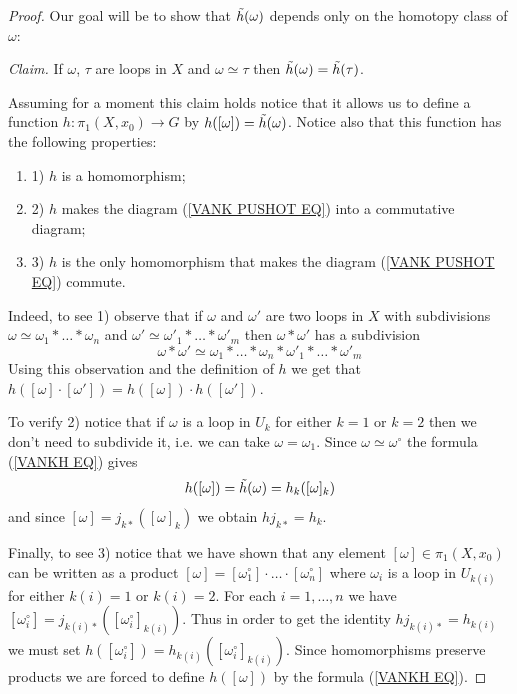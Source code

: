 \documentclass[11pt, letterpaper, oneside]{report}
\theoremstyle{pplain}
\theoremstyle{ddefinition}
\theoremstyle{nnn}
\theoremstyle{eexercise}
\newcommand{\benu}{\begin{enumerate}}
\newcommand{\eenu}{\end{enumerate}}
\newcommand{\ntilde}{\skew{3}\tilde}
\begin{document}
\begin{proof}
Our goal will be to show that $\ntilde{h}(\omega)$ depends only on the homotopy class of $\omega$:

\emph{Claim.}  If $\omega$, $\tau$ are loops in $X$ and $\omega\simeq \tau$ 
then $\ntilde{h}(\omega) = \ntilde{h}(\tau)$. 


Assuming for a moment this claim holds notice that it allows us to define a function 
$h\colon \pi_{1}(X, x_{0}) \to G$  by $h([\omega]) = \ntilde{h}(\omega)$. Notice also 
that this function has the following properties: 
\benu
\item[1)] $h$ is a homomorphism;  
\item[2)] $h$ makes the diagram (\ref{VANK PUSHOT EQ}) into a commutative diagram;
\item[3)] $h$ is the only homomorphism that makes the diagram (\ref{VANK PUSHOT EQ}) commute. 
\eenu

Indeed, to see 1) observe that if $\omega$ and $\omega'$ are  two  loops in $X$ with subdivisions 
$\omega \simeq \omega_{1}\ast {\dots}\ast \omega_{n}$ and
$\omega' \simeq \omega'_{1}\ast {\dots}\ast \omega'_{m}$ then $\omega\ast\omega'$ has a subdivision 
$$\omega\ast\omega'\simeq 
 \omega_{1}\ast {\dots}\ast \omega_{n}\ast \omega'_{1}\ast {\dots}\ast \omega'_{m}$$ 
Using this observation and the definition of $h$ we get that 
$h([\omega]\cdot [\omega']) = h([\omega])\cdot h([\omega'])$. 

To verify  2) notice that if $\omega$ is a loop in $U_{k}$  for either $k=1$ or $k=2$ then  we 
don't need to subdivide it, i.e. we can take $\omega = \omega_{1}$. Since 
$\omega \simeq \omega^{\circ}$ the formula (\ref{VANKH EQ}) 
gives 
$$h([\omega]) = \ntilde{h}(\omega) = h_{k}([\omega]_{k})$$
and since  $[\omega] = j_{k\ast}([\omega]_{k})$ we obtain $hj_{k\ast} = h_{k}$. 
 
Finally,  to see 3) notice that we have shown that any element $[\omega]\in \pi_{1}(X, x_{0})$
can be written as a product $[\omega] = [\omega_{1}^{\circ}]\cdot {\dots}\cdot [\omega_{n}^{\circ}]$
where $\omega_{i}$  is a loop in $U_{k(i)}$ for either $k(i)=1$ or $k(i)=2$. For each $i=1, \dots, n$ 
we have $[\omega_{i}^{\circ}] = j_{k(i)\ast}([\omega_{i}^{\circ}]_{k(i)})$. Thus in order to get the identity $hj_{k(i)\ast} = h_{k(i)}$ 
we must set $h([\omega_{i}^{\circ}]) = h_{k(i)}([\omega_{i}^{\circ}]_{k(i)})$. Since homomorphisms preserve products 
we are forced to define $h([\omega])$ by the formula (\ref{VANKH EQ}). 


\end{proof}
\end{document}
